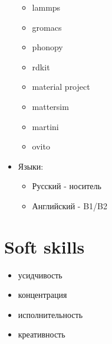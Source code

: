\documentclass[a4paper, 12pt]{article}
\begin{document}
\begin{itemize}
    \begin{itemize}
        \item lammps
        \item gromacs
        \item phonopy
        \item rdkit
        \item material project
        \item mattersim
        \item martini
        \item ovito
    \end{itemize}
    \item Языки:
    \begin{itemize}
        \item Русский    - носитель
        \item Английский - B1/B2
    \end{itemize}
\end{itemize}

\section{Soft skills}
\begin{itemize}
    \item усидчивость
    \item концентрация
    \item исполнительность
    \item креативность
\end{itemize}
\end{document}
